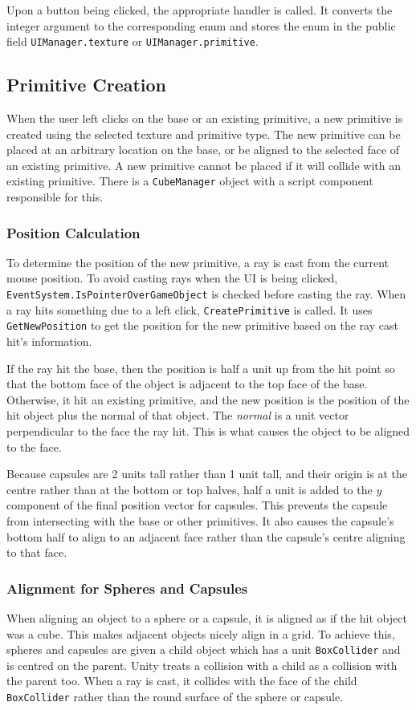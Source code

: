 \documentclass[a4paper, 12pt]{scrartcl}
\begin{document}
Upon a button being clicked, the appropriate handler is called. It converts the integer argument to the corresponding enum and stores the enum in the public field \texttt{UIManager.texture} or \texttt{UIManager.primitive}.

\subsection{Primitive Creation}
When the user left clicks on the base or an existing primitive, a new primitive is created using the selected texture and primitive type. The new primitive can be placed at an arbitrary location on the base, or be aligned to the selected face of an existing primitive. A new primitive cannot be placed if it will collide with an existing primitive. There is a \texttt{CubeManager} object with a script component responsible for this.

\subsubsection{Position Calculation}
To determine the position of the new primitive, a ray is cast from the current mouse position. To avoid casting rays when the UI is being clicked, \texttt{EventSystem.IsPointerOver\-GameObject} is checked before casting the ray. When a ray hits something due to a left click, \texttt{CreatePrimitive} is called. It uses \texttt{GetNewPosition} to get the position for the new primitive based on the ray cast hit's information.

If the ray hit the base, then the position is half a unit up from the hit point so that the bottom face of the object is adjacent to the top face of the base. Otherwise, it hit an existing primitive, and the new position is the position of the hit object plus the normal of that object. The \textit{normal} is a unit vector perpendicular to the face the ray hit. This is what causes the object to be aligned to the face.

Because capsules are 2 units tall rather than 1 unit tall, and their origin is at the centre rather than at the bottom or top halves, half a unit is added to the $y$ component of the final position vector for capsules. This prevents the capsule from intersecting with the base or other primitives. It also causes the capsule's bottom half to align to an adjacent face rather than the capsule's centre aligning to that face.

\subsubsection{Alignment for Spheres and Capsules}
When aligning an object to a sphere or a capsule, it is aligned as if the hit object was a cube. This makes adjacent objects nicely align in a grid. To achieve this, spheres and capsules are given a child object which has a unit \texttt{BoxCollider} and is centred on the parent. Unity treats a collision with a child as a collision with the parent too. When a ray is cast, it collides with the face of the child \texttt{BoxCollider} rather than the round surface of the sphere or capsule.
\end{document}
